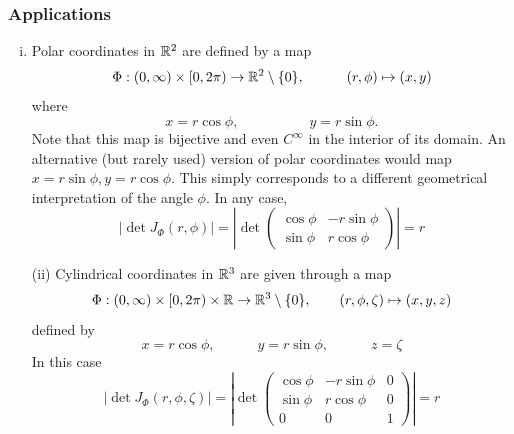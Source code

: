 \documentclass[12pt, t]{beamer}
\begin{document}
\begin{frame}[allowframebreaks]
    \frametitle{Applications}
    \begin{enumerate}[(i)]
        \item Polar coordinates in $\mathbb{R}^2$ are defined by a map
              \[\Phi:(0,\infty)\times[0,2\pi)\to\mathbb{R}^2\setminus\{0\},
                  \qquad\quad(r,\phi)\mapsto(x,y)\]
              where
              \[x=r\cos\phi,\qquad\qquad\quad
                  y=r\sin\phi.\]
              Note that this map is bijective and even $C^\infty$ in the interior of its
              domain. An alternative (but rarely used) version of polar coordinates
              would map $x=r\sin\phi,y=r\cos\phi$. This simply corresponds to a
              dif{}ferent geometrical interpretation of the angle $\phi$. In any case,
              \[|\det J_\Phi(r,\phi)|=\left|\det\begin{pmatrix}
                      \cos\phi & -r\sin\phi \\
                      \sin\phi & r\cos\phi
                  \end{pmatrix}\right|=r\]
    \end{enumerate}
    \begin{itemize}
        \item[(ii)] Cylindrical coordinates in $\mathbb{R}^3$ are given through a map
              \[\Phi:(0,\infty)\times[0,2\pi)\times\mathbb{R}\to\mathbb{R}^3\setminus\{0\},\qquad
                  (r,\phi,\zeta)\mapsto(x,y,z)\]
              defined by
              \[x=r\cos\phi,\qquad\quad y=r\sin\phi,\qquad\quad z=\zeta\]
              In this case
              \[|\det J_\Phi(r,\phi,\zeta)|=\left|\det\begin{pmatrix}
                      \cos\phi & -r\sin\phi & 0 \\
                      \sin\phi & r\cos\phi  & 0 \\
                      0        & 0          & 1
                  \end{pmatrix}\right|=r\]


\end{itemize}
\end{frame}
\end{document}
